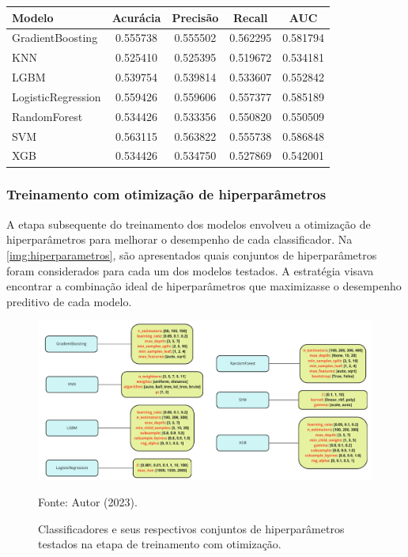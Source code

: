 \begin{table}[H]
	{
		\begin{tabular}{lcccc}
			\toprule
			\textbf{Modelo} & \textbf{Acurácia} & \textbf{Precisão} & \textbf{Recall} & \textbf{AUC} \\
			\midrule \midrule
			GradientBoosting & 0.555738 & 0.555502 & 0.562295 & 0.581794 \\
			\midrule
			KNN & 0.525410 & 0.525395 & 0.519672 & 0.534181 \\
			\midrule
			LGBM & 0.539754 & 0.539814 & 0.533607 & 0.552842 \\
			\midrule
			LogisticRegression & 0.559426 & 0.559606 & 0.557377 & 0.585189 \\
			\midrule
			RandomForest & 0.534426 & 0.533356 & 0.550820 & 0.550509 \\
			\midrule
			SVM & 0.563115 & 0.563822 & 0.555738 & 0.586848 \\
			\midrule
			XGB & 0.534426 & 0.534750 & 0.527869 & 0.542001 \\
			\bottomrule
		\end{tabular}
	}
	{
	}
\end{table}

\subsubsection{Treinamento com otimização de hiperparâmetros}

A etapa subsequente do treinamento dos modelos envolveu a otimização de hiperparâmetros para melhorar o desempenho de cada classificador. Na \autoref{img:hiperparametros}, são apresentados quais conjuntos de hiperparâmetros foram considerados para cada um dos modelos testados. A estratégia visava encontrar a combinação ideal de hiperparâmetros que maximizasse o desempenho preditivo de cada modelo.

\begin{figure}[H]
	\centering
	\caption{\label{img:hiperparametros}Classificadores e seus respectivos conjuntos de hiperparâmetros testados na etapa de treinamento com otimização.}
	\includegraphics[scale=0.7]{USPSC-img/hiperparametros.pdf}
	\begin{center}
		Fonte: Autor (2023).
	\end{center}
\end{figure}


